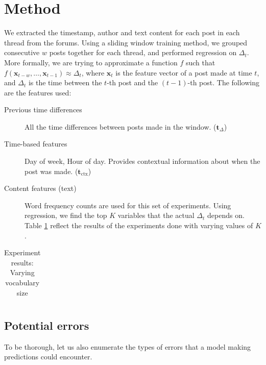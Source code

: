 \documentclass[12 pt]{article}
\begin{document}
\newcommand{\vocab}{\mathbf{v}}
\newcommand{\dtvec}{\mathbf{t}_\Delta}
\newcommand{\ctxvec}{\mathbf{t}_\text{ctx}}
\newcommand{\dt}{\Delta_t}
\newcommand{\prerror}{Pr_{error}}
\newcommand{\fvec}{\mathbf{x}}
\newcommand{\weights}{\mathbf{w}}
\newcommand{\X}{\mathbf{X}}
\section{Method}

We extracted the timestamp, author and text content for each post in each thread from the forums. Using a sliding window training method, we grouped consecutive $w$ posts together for each thread, and performed regression on $\dt$. More formally, we are trying to approximate a function $f$ such that $f(\fvec_{t-w},\hdots, \fvec_{t-1}) \approx \Delta_{t}$, where $\fvec_t$ is the feature vector of a post made at time $t$, and $\dt$ is the time between the $t$-th post and the $(t-1)$-th post. The following are the features used:

\begin{description}
	\item[Previous time differences] All the time differences between posts made in the window. ($\dtvec$)
	\item[Time-based features] Day of week, Hour of day. Provides contextual information about when the post was made. ($\ctxvec$)
	
	\item[Content features (text)]
		Word frequency counts are used for this set of experiments. Using regression, we find the top $K$ variables that the actual $\dt$ depends on. Table \ref{vocab_exp} reflect the results of the experiments done with varying values of $K$.

\end{description}


\begin{table}
	\footnotesize
	\begin{centering}
	\begin{tabular}{|l|c|c|c|c|c|c|c|c|}
	\hline
	
	\hline
	\end{tabular}
	\caption{Experiment results: Varying vocabulary size}
	\label{vocab_exp}
\end{centering}
\end{table}

\subsection{Potential errors}
To be thorough, let us also enumerate the types of errors that a model making predictions could encounter.
\end{document}
